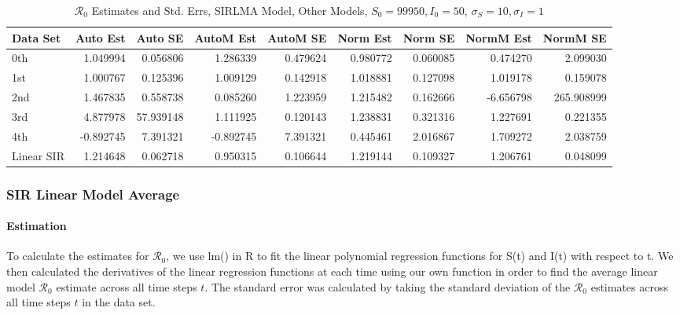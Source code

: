 \documentclass[12pt]{article}
\newcommand{\rr}{\ensuremath{\mathcal{R}_0}}
\begin{document}
\begin{table}[H]
	
	\caption{$\rr$ Estimates and Std. Errs, SIRLMA Model,
		Other Models, $S_0 = 99950, I_0 = 50$, 
		$\sigma_S = 10, \sigma_I = 1$}
	\begin{footnotesize}
		\hskip -1cm
	\begin{tabular}{l|r|r|r|r|r|r|r|r}
		\hline
		Data Set & Auto Est & Auto SE & AutoM Est & AutoM SE & Norm Est & Norm SE & NormM Est & NormM SE\\
		\hline
		0th & 1.049994 & 0.056806 & 1.286339 & 0.479624 & 0.980772 & 0.060085 & 0.474270 & 2.099030\\
		\hline
		1st & 1.000767 & 0.125396 & 1.009129 & 0.142918 & 1.018881 & 0.127098 & 1.019178 & 0.159078\\
		\hline
		2nd & 1.467835 & 0.558738 & 0.085260 & 1.223959 & 1.215482 & 0.162666 & -6.656798 & 265.908999\\
		\hline
		3rd & 4.877978 & 57.939148 & 1.111925 & 0.120143 & 1.238831 & 0.321316 & 1.227691 & 0.221355\\
		\hline
		4th & -0.892745 & 7.391321 & -0.892745 & 7.391321 & 0.445461 & 2.016867 & 1.709272 & 2.038759\\
		\hline
		Linear SIR & 1.214648 & 0.062718 & 0.950315 & 0.106644 & 1.219144 & 0.109327 & 1.206761 & 0.048099\\
		\hline
	\end{tabular}
\end{footnotesize}
\end{table}

\subsubsection{SIR Linear Model Average}

\paragraph{Estimation}

To calculate the estimates for $\rr$, we use lm() in R to fit the linear polynomial regression functions for S(t) and I(t) with respect to t. We then calculated the derivatives of the linear regression functions at each time using our own function in order to find the average linear model $\rr$ estimate across all time steps $t$. The standard error was calculated by taking the standard deviation of the $\rr$ estimates across all time steps $t$ in the data set.
\end{document}
